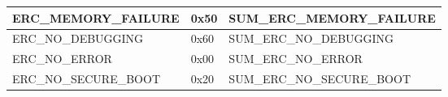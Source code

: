 \begin{longtable}{|l|l|l|}
\begin{minipage}{0.38\linewidth}\raggedright\vspace{.75ex}ERC\_MEMORY\_FAILURE\vspace{.75ex}\end{minipage} & \begin{minipage}{0.15\linewidth}\raggedright\vspace{.75ex}0x50\vspace{.75ex}\end{minipage} & \begin{minipage}{0.38\linewidth}\raggedright\vspace{.75ex}SUM\_ERC\_MEMORY\_FAILURE\vspace{.75ex}\end{minipage}\\\hline
\begin{minipage}{0.38\linewidth}\raggedright\vspace{.75ex}ERC\_NO\_DEBUGGING\vspace{.75ex}\end{minipage} & \begin{minipage}{0.15\linewidth}\raggedright\vspace{.75ex}0x60\vspace{.75ex}\end{minipage} & \begin{minipage}{0.38\linewidth}\raggedright\vspace{.75ex}SUM\_ERC\_NO\_DEBUGGING\vspace{.75ex}\end{minipage}\\\hline
\begin{minipage}{0.38\linewidth}\raggedright\vspace{.75ex}ERC\_NO\_ERROR\vspace{.75ex}\end{minipage} & \begin{minipage}{0.15\linewidth}\raggedright\vspace{.75ex}0x00\vspace{.75ex}\end{minipage} & \begin{minipage}{0.38\linewidth}\raggedright\vspace{.75ex}SUM\_ERC\_NO\_ERROR\vspace{.75ex}\end{minipage}\\\hline
\begin{minipage}{0.38\linewidth}\raggedright\vspace{.75ex}ERC\_NO\_SECURE\_BOOT\vspace{.75ex}\end{minipage} & \begin{minipage}{0.15\linewidth}\raggedright\vspace{.75ex}0x20\vspace{.75ex}\end{minipage} & \begin{minipage}{0.38\linewidth}\raggedright\vspace{.75ex}SUM\_ERC\_NO\_SECURE\_BOOT\vspace{.75ex}\end{minipage}\\\hline

\end{longtable}
